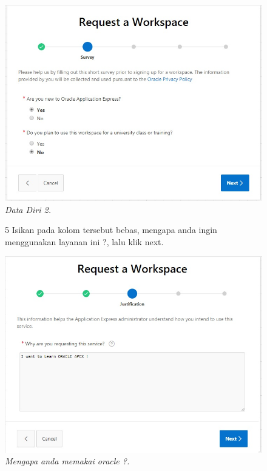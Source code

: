 \begin{enumerate}
\begin{figure}[!htbp]
    \begin{center}
\includegraphics[scale=0.4]{figures/req2.jpg}
    \caption{\textit{Data Diri 2.}}
        \end{center}
        \end{figure}

\begin{figure}
\item[5]Isikan pada kolom tersebut bebas, mengapa anda ingin menggunakan layanan ini ?, lalu klik next.

    \begin{center}
\includegraphics[scale=0.5]{figures/req3.jpg}
    \caption{\textit{Mengapa anda memakai oracle ?.}}
        \end{center}


\end{figure}
\end{enumerate}
